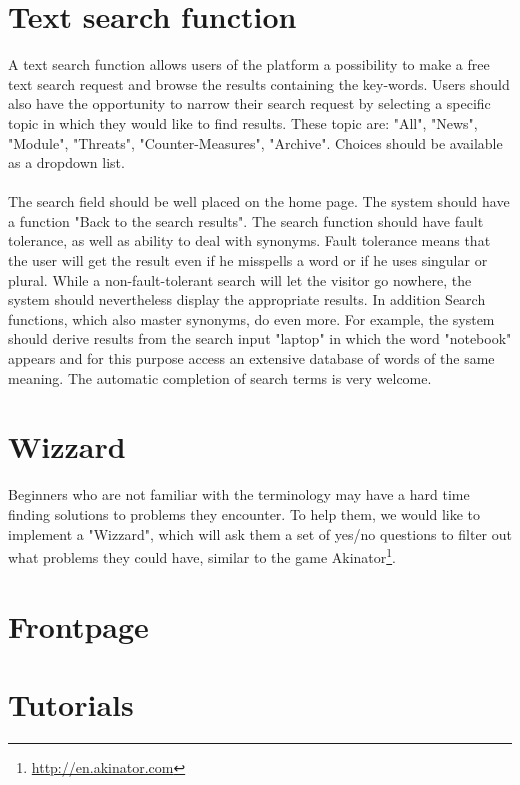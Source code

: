\section{Text search function}
A text search function allows users of the platform a possibility to make a free text search request and browse the results containing the key-words. Users should also have the opportunity to narrow their search request by selecting a specific topic in which they would like to find results. These topic are: "All", "News", "Module", "Threats", "Counter-Measures", "Archive". Choices should be available as a dropdown list.
\\\\
The search field should be well placed on the home page. The system should have a function "Back to the search results". The search function should have fault tolerance, as well as ability to deal with synonyms. Fault tolerance means that the user will get the result even if he misspells a word or if he uses singular or plural. While a non-fault-tolerant search will let the visitor go nowhere, the system should nevertheless display the appropriate results.
In addition Search functions, which also master synonyms, do even more. For example, the system should derive results from the search input "laptop" in which the word "notebook" appears and for this purpose access an extensive database of words of the same meaning. The automatic completion of search terms is very welcome.
\section{Wizzard}
Beginners who are not familiar with the terminology may have a hard time finding solutions to problems they encounter. To help them, we would like to implement a "Wizzard", which will ask them a set of yes/no questions to filter out what problems they could have, similar to the game Akinator\footnote{\url{http://en.akinator.com}}. 
\section{Frontpage}
\section{Tutorials}